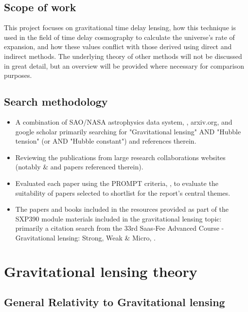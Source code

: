 \documentclass[12pt]{report}
\begin{document}
\section{Scope of work}

This project focuses on gravitational time delay lensing, how this technique is used in the field of time delay cosmography to calculate the universe's rate of expansion, and how these values conflict with those derived using direct and indirect methods. The underlying theory of other methods will not be discussed in great detail, but an overview will be provided where necessary for comparison purposes.

\section{Search methodology}

\begin{itemize}

    \item A combination of SAO/NASA astrophysics data system, \textcite{ADS2022}, arxiv.org, and google scholar primarily searching for "Gravitational lensing" AND "Hubble tension" (or AND "Hubble constant") and references therein.
    \item Reviewing the publications from large research collaborations websites (notably \textcite{TDCOSMO} \& \textcite{H0LiCOW} and papers referenced therein).
    \item Evaluated each paper using the PROMPT criteria, \textcite{OU2014}, to evaluate the suitability of papers selected to shortlist for the report's central themes.
    \item The papers and books included in the resources provided as part of the SXP390 module materials included in the gravitational lensing topic: primarily a citation search from the 33rd Saas-Fee Advanced Course - Gravitational lensing: Strong, Weak \& Micro, \textcite{Kochanek2004}.
\end{itemize}


\chapter{Gravitational lensing theory}

\vspace{-0.75cm}

\section{General Relativity to Gravitational lensing}
\end{document}
